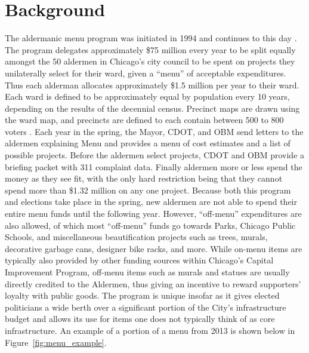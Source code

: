 \section{Background}\label{sec:background}

The aldermanic menu program was initiated in 1994 and continues to this day \cite{OIGaudit}. 
The program delegates approximately \$75 million every year to be split equally amongst the 50 aldermen in Chicago's city council to be spent on projects they unilaterally select for their ward, given a ``menu'' of acceptable expenditures. 
Thus each alderman allocates approximately \$1.5 million per year to their ward.
Each ward is defined to be approximately equal by population every 10 years, depending on the results of the decennial census.
Precinct maps are drawn using the ward map, and precincts are defined to each contain between 500 to 800 voters \cite{Crowley_2022}.
Each year in the spring, the Mayor, CDOT, and OBM send letters to the aldermen explaining Menu and provides a menu of cost estimates and a list of possible projects.
Before the aldermen select projects, CDOT and OBM provide a briefing packet with 311 complaint data.
Finally aldermen more or less spend the money as they see fit, with the only hard restriction being that they cannot spend more than \$1.32 million on any one project.
Because both this program and elections take place in the spring, new aldermen are not able to spend their entire menu funds until the following year.
However, ``off-menu'' expenditures are also allowed, of which most ``off-menu'' funds go towards Parks, Chicago Public Schools, and miscellaneous beautification projects such as trees, murals, decorative garbage cans, designer bike racks, and more\cite{OIGaudit}. 
While on-menu items are typically also provided by other funding sources within Chicago's Capital Improvement Program, off-menu items such as murals and statues are usually directly credited to the Aldermen, thus giving an incentive to reward supporters' loyalty with public goods.
The program is unique insofar as it gives elected politicians a wide berth over a significant portion of the City's infrastructure budget and allows its use for items one does not typically think of as core infrastructure. 
An example of a portion of a menu from 2013 is shown below in Figure~\ref{fig:menu_example}.


